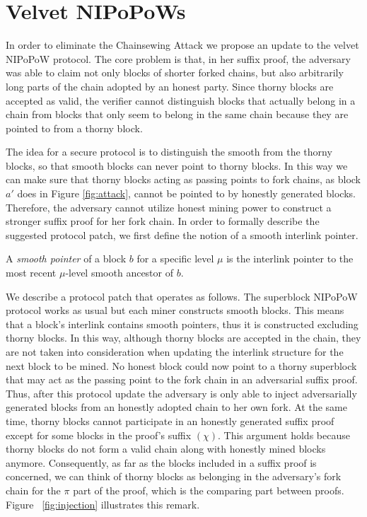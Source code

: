 \section{Velvet NIPoPoWs}\label{sec:construction}
In order to eliminate the Chainsewing Attack we propose an update to the velvet NIPoPoW protocol. The core problem is that, in her suffix proof, the adversary was able to claim not only blocks of shorter forked chains, but also arbitrarily long parts of the chain adopted by an honest party. Since thorny blocks are accepted as valid, the verifier cannot distinguish blocks that actually belong in a chain from blocks that only seem to belong in the same chain because they are pointed to from a thorny block.

The idea for a secure protocol is to distinguish the smooth from the thorny blocks, so that smooth blocks can never point to thorny blocks. In this way we can make sure that thorny blocks acting as passing points to fork chains, as block $a'$ does in Figure \ref{fig:attack}, cannot be pointed to by honestly generated blocks. Therefore, the adversary cannot utilize honest mining power to construct a stronger suffix proof for her fork chain. In order to formally describe the suggested protocol patch, we first define the notion of a smooth interlink pointer.

\begin{definition}
  A \emph{smooth pointer} of a block $b$ for a specific level $\mu$ is the interlink pointer to the most recent $\mu$-level smooth ancestor of $b$.
	\label{defn:smooth_pointer}
\end{definition}

We describe a protocol patch that operates as follows. The superblock NIPoPoW protocol works as usual but each miner constructs smooth blocks. This means that  a block's interlink contains smooth pointers, thus it is constructed excluding thorny blocks. In this way, although thorny blocks are accepted in the chain, they are not taken into consideration when updating the interlink structure for the next block to be mined. No honest block could now point to a thorny superblock that may act as the passing point to the fork chain in an adversarial suffix proof. Thus, after this protocol update the adversary is only able to inject adversarially generated blocks from an honestly adopted chain to her own fork.
At the same time, thorny blocks cannot participate in an honestly generated suffix proof except for some blocks in the proof's suffix $(\chi)$. This argument holds because thorny blocks do not form a valid chain along with honestly mined blocks anymore. Consequently, as far as the blocks included in a suffix proof is concerned, we can think of thorny blocks as belonging in the adversary's fork chain for the $\pi$ part of the proof,  which is the comparing part between proofs. Figure~
\ref{fig:injection} illustrates this remark.

